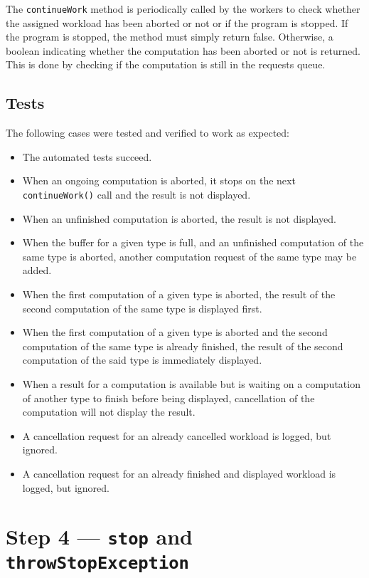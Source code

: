 \documentclass{article}
\begin{document}
    The \texttt{continueWork} method is periodically called by the workers to check whether the assigned workload has been aborted or not or if the program is stopped.
    If the program is stopped, the method must simply return false.
    Otherwise, a boolean indicating whether the computation has been aborted or not is returned.
    This is done by checking if the computation is still in the requests queue.

    \subsection*{Tests}

    The following cases were tested and verified to work as expected:

    \begin{itemize}
        \item The automated tests succeed.
        \item When an ongoing computation is aborted, it stops on the next \texttt{continueWork()} call and the result is not displayed.
        \item When an unfinished computation is aborted, the result is not displayed.
        \item When the buffer for a given type is full, and an unfinished computation of the same type is aborted, another computation request of the same type may be added.
        \item When the first computation of a given type is aborted, the result of the second computation of the same type is displayed first.
        \item When the first computation of a given type is aborted and the second computation of the same type is already finished, the result of the second computation of the said type is immediately displayed.
        \item When a result for a computation is available but is waiting on a computation of another type to finish before being displayed, cancellation of the computation will not display the result.
        \item A cancellation request for an already cancelled workload is logged, but ignored.
        \item A cancellation request for an already finished and displayed workload is logged, but ignored.
    \end{itemize}

    \pagebreak

    \section*{Step 4 --- \texttt{stop} and \texttt{throwStopException}}
\end{document}
